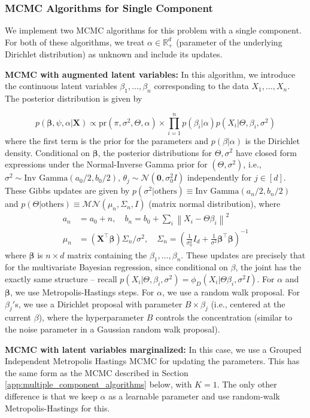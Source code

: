 \documentclass[bj,authoryear]{imsart}
\theoremstyle{plain}
\theoremstyle{remark}
\def\bX{\mathbf{X}}
\def\bbeta{{\boldsymbol\beta}}
\def\bbR{\mathbb{R}}
\def\cM{\mathcal{M}}
\def\cN{\mathcal{N}}
\def\norm#1{\left\|#1\right\|}
\begin{document}
\begin{appendix}
\subsubsection{MCMC Algorithms for Single Component}
\label{app:MCMC_algorithm_single}
We implement two MCMC algorithms for this problem with a single component. For both of these algorithms, we treat $\alpha\in\bbR^d_+$ (parameter of the underlying Dirichlet distribution) as unknown and include its updates.

\textbf{MCMC with augmented latent variables:} In this algorithm, we introduce the continuous latent variables $\beta_1,\dots,\beta_n$ corresponding to the data $X_1,\dots,X_n$. The posterior distribution is given by

$$p(\bbeta, \psi, \alpha|\bX) \propto \text{pr}(\pi,\sigma^2,\Theta,\alpha)\times \prod_{i=1}^n p(\beta_i|\alpha)p(X_i|\Theta,\beta_i,\sigma^2)$$
where the first term is the prior for the parameters and $p(\beta|\alpha)$ is the Dirichlet density. Conditional on $\bbeta$, the posterior distributions for $\Theta, \sigma^2$ have closed form expressions under the Normal-Inverse Gamma prior for $(\Theta,\sigma^2)$, i.e., $\sigma^2\sim \text{Inv Gamma}(a_0/2, b_0/2)$, $\theta_j\sim \cN(\boldsymbol{0}, \sigma_0^2 I)$ independently for $j\in[d]$. These Gibbs updates are given by $p(\sigma^2|\text{others})\equiv \text{Inv Gamma}(a_n/2, b_n/2)$ and $p(\Theta|\text{others})\equiv \cM\cN (\mu_n, \Sigma_n, I)$ (matrix normal distribution), where
\begin{align*}
    a_n &= a_0 + n, \quad b_n = b_0 + \sum_i \norm{X_i - \Theta\beta_i}^2 \\
    \mu_n &= (\bX^\top \bbeta) \Sigma_n / \sigma^2,\quad  \Sigma_n = \left(\frac{1}{\sigma_0^2} I_d + \frac{1}{\sigma^2} \bbeta^\top\bbeta\right)^{-1}
\end{align*}
where $\bbeta$ is $n\times d$ matrix containing the $\beta_1,\dots,\beta_n$. These updates are precisely that for the multivariate Bayesian regression, since conditional on $\beta$, the joint has the exactly same structure -- recall $p(X_i|\Theta,\beta_i,\sigma^2) = \phi_D(X_i|\Theta\beta_i, \sigma^2 I)$. For $\alpha$ and $\bbeta$, we use Metropolis-Hastings steps. For $\alpha$, we use a random walk proposal. For $\beta_j'$s, we use a Dirichlet proposal with parameter $B\times \beta_j$ (i.e., centered at the current $\beta$), where the hyperparameter $B$ controls the concentration (similar to the noise parameter in a Gaussian random walk proposal).

\textbf{MCMC with latent variables marginalized:} In this case, we use a Grouped Independent Metropolis Hastings MCMC for updating the parameters. This has the same form as the MCMC described in Section \ref{app:multiple_component_algorithms} below, with $K=1$. The only other difference is that we keep $\alpha$ as a learnable parameter and use random-walk Metropolis-Hastings for this.


\end{appendix}
\end{document}
